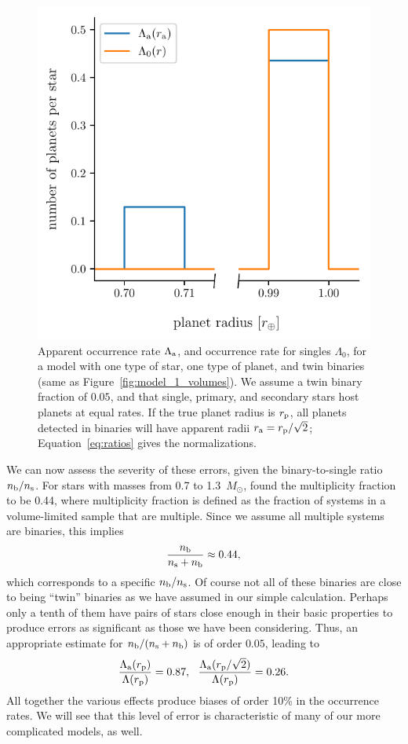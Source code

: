 \documentclass[12pt,modern]{aastex61}
\renewcommand{\a}{_{\rm a}}
\newcommand{\s}{_{\rm s}}
\newcommand{\p}{_{\rm p}}
\renewcommand{\b}{_{\rm b}}
\begin{document}
\begin{figure}[!tb]
    \begin{center}
        \includegraphics[width=.6\textwidth]{figures/occ_rate_vs_radius_model_1_brokenx.pdf}
    \end{center}
    \vspace{-0.5cm}
    \caption{
        Apparent occurrence rate $\Lambda\a$, and occurrence rate for
        singles $\Lambda_0$, for a model with one type of star, one
        type of planet, and twin binaries (same as
        Figure~\ref{fig:model_1_volumes}).  We assume a twin binary
        fraction of $0.05$, and that single, primary, and secondary
        stars host planets at equal rates.  If the true planet radius
        is $r\p$, all planets detected in binaries will have apparent
        radii $r\a = r\p/\sqrt{2}$; Equation~\ref{eq:ratios} gives the
        normalizations.
    }
    \label{fig:occ_rate_model_1}
\end{figure}

We can now assess the severity of these errors, given the
binary-to-single ratio $n\b/n\s$. For stars with masses from 0.7 to
1.3~$M_\odot$, \citet{raghavan_survey_2010} found the multiplicity
fraction to be 0.44, where multiplicity fraction is defined as
the fraction of systems in a volume-limited sample that are multiple.
Since we assume all multiple systems are binaries, this implies
\begin{equation}
    \frac{n\b}{n\s + n\b} \approx 0.44,
\end{equation}
which corresponds to a specific $n\b/n\s$.  Of course not all of these
binaries are close to being ``twin'' binaries as we have assumed in
our simple calculation. Perhaps only a tenth of them have pairs of
stars close enough in their basic properties to produce errors as
significant as those we have been considering.  Thus, an appropriate
estimate for $n\b/(n\s+n\b)$ is of order $0.05$, leading to
\begin{equation}
    \frac{\Lambda\a(r\p)}{\Lambda(r\p)} = 0.87,~~
    \frac{\Lambda\a(r\p/\sqrt{2})}{\Lambda(r\p)} = 0.26.
    \label{eq:ratios}
\end{equation}
All together the various effects produce biases of order 10\% in the
occurrence rates.  We will see that this level of error is
characteristic of many of our more complicated models, as well.
\end{document}
